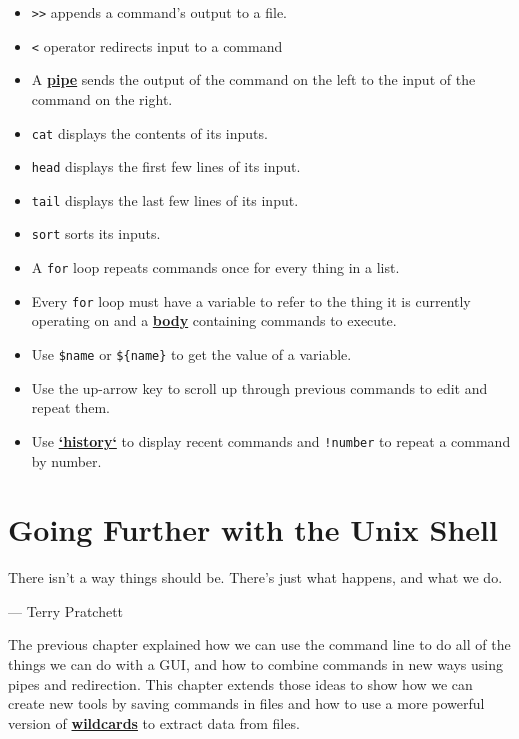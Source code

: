 \documentclass[
]{krantz}
\renewenvironment{quote}{\begin{VF}}{\end{VF}}
\newcommand{\gref}[2]{\hyperlink{#2}{\textbf{#1}}}
\begin{document}
\begin{itemize}
\item
  \texttt{\textgreater{}\textgreater{}} appends a command's output to a file.
\item
  \texttt{\textless{}} operator redirects input to a command
\item
  A \gref{pipe}{pipe\_shell} \texttt{\textbar{}} sends the output of the command on the left to the input of the command on the right.
\item
  \texttt{cat} displays the contents of its inputs.
\item
  \texttt{head} displays the first few lines of its input.
\item
  \texttt{tail} displays the last few lines of its input.
\item
  \texttt{sort} sorts its inputs.
\item
  A \texttt{for} loop repeats commands once for every thing in a list.
\item
  Every \texttt{for} loop must have a variable to refer to the thing it is currently operating on
  and a \gref{body}{loop\_body} containing commands to execute.
\item
  Use \texttt{\$name} or \texttt{\$\{name\}} to get the value of a variable.
\item
  Use the up-arrow key to scroll up through previous commands to edit and repeat them.
\item
  Use \gref{`history`}{command\_history} to display recent commands and \texttt{!number} to repeat a command by number.
\end{itemize}

\hypertarget{bash-advanced}{%
\chapter{Going Further with the Unix Shell}\label{bash-advanced}}

\begin{quote}
There isn't a way things should be. There's just what happens, and what we do.

--- Terry Pratchett
\end{quote}

The previous chapter explained how we can use the command line
to do all of the things we can do with a GUI,
and how to combine commands in new ways using pipes and redirection.
This chapter extends those ideas to show
how we can create new tools by saving commands in files
and how to use a more powerful version of \gref{wildcards}{wildcard}
to extract data from files.
\end{document}
